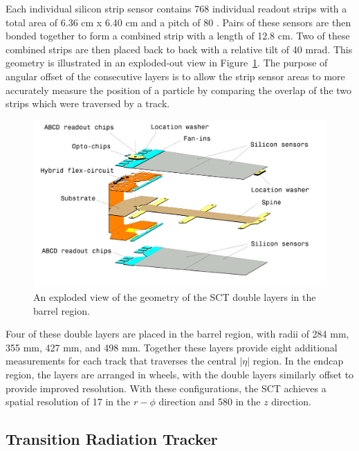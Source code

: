 Each individual silicon strip sensor contains 768 individual readout strips with a total area of 6.36 cm x 6.40 cm and a pitch of 80 \um. 
Pairs of these sensors are then bonded together to form a combined strip with a length of 12.8 cm.
Two of these combined strips are then placed back to back with a relative tilt of 40 mrad.
This geometry is illustrated in an exploded-out view in Figure~\ref{fig:sct_geometry}.
The purpose of angular offset of the consecutive layers is to allow the strip sensor areas to more accurately measure the position of a particle by comparing the overlap of the two strips which were traversed by a track.

\begin{figure}[hbtp]
\centering
\includegraphics[width=\fullfig]{figures/sct_geometry.png}
\caption{An exploded view of the geometry of the \ac{SCT} double layers in the barrel region.}
\label{fig:sct_geometry}
\end{figure}

Four of these double layers are placed in the barrel region, with radii of 284 mm, 355 mm, 427 mm, and 498 mm. 
Together these layers provide eight additional measurements for each track that traverses the central $|\eta|$ region.
In the endcap region, the layers are arranged in wheels, with the double layers similarly offset to provide improved resolution.
With these configurations, the \ac{SCT} achieves a spatial resolution of 17 \um in the $r-\phi$ direction and 580 \um in the $z$ direction.

\subsection{Transition Radiation Tracker}


